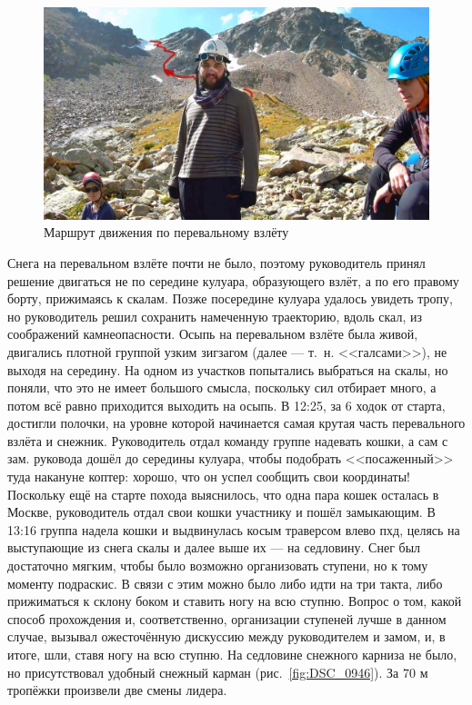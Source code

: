 \begin{figure}[h!]
	\centering
	\includegraphics[width=0.7\linewidth]{../pics/20aug2.jpg}
	\caption{Маршрут движения по перевальному взлёту}
	\label{fig:20aug2.jpg}
\end{figure}

Снега на перевальном взлёте почти не было, поэтому руководитель принял решение двигаться не по середине кулуара, образующего взлёт, а по его правому борту, прижимаясь к скалам. Позже посередине кулуара удалось увидеть тропу, но руководитель решил сохранить намеченную траекторию, вдоль скал, из соображений камнеопасности. Осыпь на перевальном взлёте была живой, двигались плотной группой узким зигзагом (далее --- т.~н. <<галсами>>), не выходя на середину. На одном из участков попытались выбраться на скалы, но поняли, что это не имеет большого смысла, поскольку сил отбирает много, а потом всё равно приходится выходить на осыпь. В 12:25, за 6 ходок от старта, достигли полочки, на уровне которой начинается самая крутая часть перевального взлёта и снежник. Руководитель отдал команду группе надевать кошки, а сам с зам. руковода дошёл до середины кулуара, чтобы подобрать <<посаженный>> туда накануне коптер: хорошо, что он успел сообщить свои координаты! Поскольку ещё на старте похода выяснилось, что одна пара кошек осталась в Москве, руководитель отдал свои кошки участнику и пошёл замыкающим. В 13:16 группа надела кошки и выдвинулась косым траверсом влево пхд, целясь на выступающие из снега скалы и далее выше их --- на седловину. Снег был достаточно мягким, чтобы было возможно организовать ступени, но к тому моменту подраскис. В связи с этим можно было либо идти на три такта, либо прижиматься к склону боком и ставить ногу на всю ступню. Вопрос о том, какой способ прохождения и, соответственно, организации ступеней лучше в данном случае, вызывал ожесточённую дискуссию между руководителем и замом, и, в итоге, шли, ставя ногу на всю ступню. На седловине снежного карниза не было, но присутствовал удобный снежный карман (рис.~\ref{fig:DSC_0946}). За 70 м тропёжки произвели две смены лидера.
